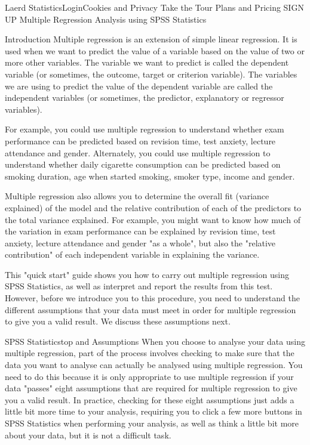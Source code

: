 \documentclass[]{article}
\begin{document}
	Laerd StatisticsLoginCookies and Privacy
	Take the Tour Plans and Pricing SIGN UP
	Multiple Regression Analysis using SPSS Statistics
	
	Introduction
	Multiple regression is an extension of simple linear regression. It is used when we want to predict the value of a variable based on the value of two or more other variables. The variable we want to predict is called the dependent variable (or sometimes, the outcome, target or criterion variable). The variables we are using to predict the value of the dependent variable are called the independent variables (or sometimes, the predictor, explanatory or regressor variables).
	
	For example, you could use multiple regression to understand whether exam performance can be predicted based on revision time, test anxiety, lecture attendance and gender. Alternately, you could use multiple regression to understand whether daily cigarette consumption can be predicted based on smoking duration, age when started smoking, smoker type, income and gender.
	
	Multiple regression also allows you to determine the overall fit (variance explained) of the model and the relative contribution of each of the predictors to the total variance explained. For example, you might want to know how much of the variation in exam performance can be explained by revision time, test anxiety, lecture attendance and gender "as a whole", but also the "relative contribution" of each independent variable in explaining the variance.
	
	This "quick start" guide shows you how to carry out multiple regression using SPSS Statistics, as well as interpret and report the results from this test. However, before we introduce you to this procedure, you need to understand the different assumptions that your data must meet in order for multiple regression to give you a valid result. We discuss these assumptions next.
	
	SPSS Statisticstop and
	Assumptions
	When you choose to analyse your data using multiple regression, part of the process involves checking to make sure that the data you want to analyse can actually be analysed using multiple regression. You need to do this because it is only appropriate to use multiple regression if your data "passes" eight assumptions that are required for multiple regression to give you a valid result. In practice, checking for these eight assumptions just adds a little bit more time to your analysis, requiring you to click a few more buttons in SPSS Statistics when performing your analysis, as well as think a little bit more about your data, but it is not a difficult task.
	
\end{document}
